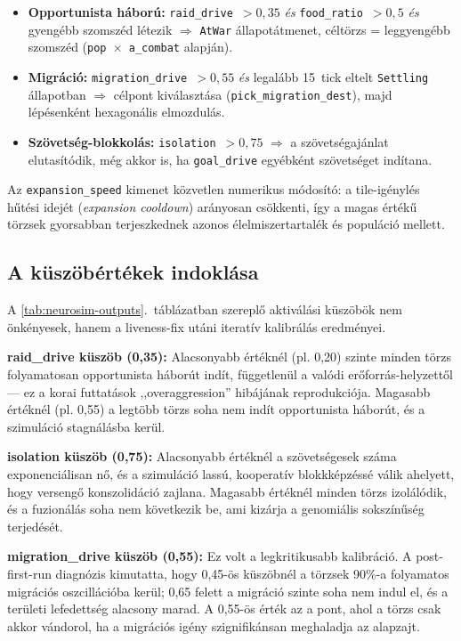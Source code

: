 ﻿\documentclass[a4paper,12pt]{report}
\begin{document}
\begin{itemize}
  \item \textbf{Opportunista háború:} \texttt{raid\_drive}~$> 0{,}35$ \textit{és}
    \texttt{food\_ratio}~$> 0{,}5$ \textit{és} gyengébb szomszéd létezik
    $\Rightarrow$ \texttt{AtWar} állapotátmenet, céltörzs = leggyengébb
    szomszéd (\texttt{pop~$\times$~a\_combat} alapján).
  \item \textbf{Migráció:} \texttt{migration\_drive}~$> 0{,}55$ \textit{és}
    legalább 15~tick eltelt \texttt{Settling} állapotban
    $\Rightarrow$ célpont kiválasztása (\texttt{pick\_migration\_dest}),
    majd lépésenként hexagonális elmozdulás.
  \item \textbf{Szövetség-blokkolás:} \texttt{isolation}~$> 0{,}75$
    $\Rightarrow$ a szövetségajánlat elutasítódik, még akkor is, ha
    \texttt{goal\_drive} egyébként szövetséget indítana.
\end{itemize}

Az \texttt{expansion\_speed} kimenet közvetlen numerikus módosító: a tile-igénylés
hűtési idejét (\textit{expansion cooldown}) arányosan csökkenti, így a magas értékű
törzsek gyorsabban terjeszkednek azonos élelmiszertartalék és populáció mellett.

\subsection*{A küszöbértékek indoklása}

A \ref{tab:neurosim-outputs}.~táblázatban szereplő aktiválási küszöbök nem önkényesek, hanem
a liveness-fix utáni iteratív kalibrálás eredményei.

\textbf{raid\_drive küszöb (0{,}35):} Alacsonyabb értéknél (pl. 0{,}20) szinte
minden törzs folyamatosan opportunista háborút indít, függetlenül a valódi
erőforrás-helyzettől --- ez a korai futtatások ,,overaggression'' hibájának
reprodukciója. Magasabb értéknél (pl. 0{,}55) a legtöbb törzs soha nem indít
opportunista háborút, és a szimuláció stagnálásba kerül.

\textbf{isolation küszöb (0{,}75):} Alacsonyabb értéknél a szövetségesek száma
exponenciálisan nő, és a szimuláció lassú, kooperatív blokkképzéssé válik
ahelyett, hogy versengő konszolidáció zajlana. Magasabb értéknél minden törzs
izolálódik, és a fuzionálás soha nem következik be, ami kizárja a genomiális
sokszínűség terjedését.

\textbf{migration\_drive küszöb (0{,}55):} Ez volt a legkritikusabb kalibráció.
A post-first-run diagnózis kimutatta, hogy 0{,}45-ös küszöbnél a törzsek 90\%-a
folyamatos migrációs oszcillációba kerül; 0{,}65 felett a migráció szinte soha
nem indul el, és a területi lefedettség alacsony marad. A 0{,}55-ös érték
az a pont, ahol a törzs csak akkor vándorol, ha a migrációs igény
szignifikánsan meghaladja az alapzajt.
\end{document}
